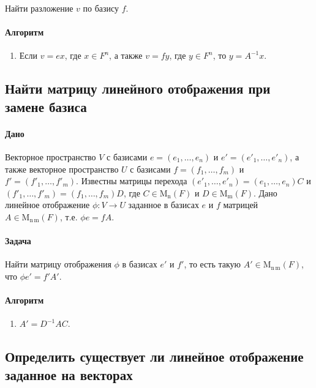 \documentclass{article}
\newcommand{\MatrixDim}[3]{\operatorname{\mathrm{M}_{#2\,#3}}(#1)}
\newcommand{\Matrix}[2]{\operatorname{\mathrm{M}_{#2}}(#1)}
\begin{document}
Найти разложение $v$ по  базису $f$.

\paragraph{Алгоритм}

\begin{enumerate}
\item Если $v = e x$, где $x\in F^{n}$, а также $v = f y$, где $y\in F^{n}$, то $y = A^{-1}x$.
\end{enumerate}

\subsection{Найти матрицу линейного отображения при замене базиса}

\paragraph{Дано}

Векторное пространство $V$ с базисами $e=(e_1,\ldots,e_n)$ и $e'=(e'_1,\ldots,e'_n)$, а также векторное пространство $U$ с базисами $f = (f_1,\ldots,f_m)$ и $f' = (f'_1,\ldots,f'_m)$.
Известны матрицы перехода $(e'_1,\ldots,e'_n) = (e_1,\ldots,e_n)C$ и $(f'_1,\ldots,f'_m) = (f_1,\ldots,f_m)D$, где $C\in \Matrix{F}{n}$ и $D\in \Matrix{F}{m}$.
Дано линейное отображение $\phi\colon V\to U$ заданное в базисах $e$ и $f$ матрицей $A\in\MatrixDim{F}{n}{m}$, т.е. $\phi e = f A$.

\paragraph{Задача}

Найти матрицу отображения $\phi$ в базисах $e'$ и $f'$, то есть такую $A'\in \MatrixDim{F}{n}{m}$, что $\phi e' = f' A'$.

\paragraph{Алгоритм}

\begin{enumerate}
\item $A' = D^{-1} A C$.
\end{enumerate}


\subsection{Определить существует ли линейное отображение заданное на векторах}
\end{document}
